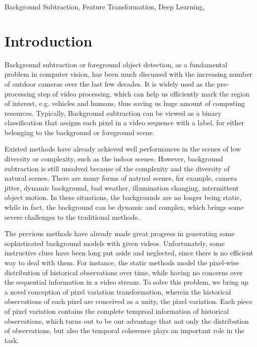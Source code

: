 \documentclass[journal]{IEEEtran}
\begin{document}
\begin{IEEEkeywords} 
    Background Subtraction, Feature Transformation, Deep Learning,
\end{IEEEkeywords}

\IEEEpeerreviewmaketitle

\section{Introduction}
Background subtraction or foreground object detection, as a fundamental problem in computer vision, has been much discussed with the increasing number of outdoor cameras over the last few decades.
It is widely used as the pre-processing step of video processing, which can help us efficiently mark the region of interest, e.g. vehicles and humans, thus saving us huge amount of computing resources.
Typically, Background subtraction can be viewed as a binary classification that assigns each pixel in a video sequence with a label, for either belonging to the background or foreground scene. 

Existed methods have already achieved well performances in the scenes of low diversity or complexity, such as the indoor scenes. However, background subtraction is still unsolved because of the complexity and the diversity of natural scenes.
There are many forms of natrual scenes, for example, camera jitter, dynamic background, bad weather, illumination changing, intermittent object motion. In these situations, the backgrounds are no longer being static, while in fact, the background can be dynamic and complex, which brings some severe challenges to the traditional methods.

The previous methods have already made great progress in generating some sophisticated background models with given videos. Unfortunately, some instructive clues have been long put aside and neglected, since there is no efficient way to deal with them. For instance, the static methods model the pixel-wise distribution of historical observations over time, while having no concerns over the sequential information in a video stream. To solve this problem, we bring up a novel conception of pixel variation transformation, wherein the historical observations of each pixel are conceived as a unity, the pixel variation. Each piece of pixel variation contains the complete temproal information of historical observations, which turns out to be our advantage that not only the distribution of observations, but also the temporal coherence plays an important role in the task.
\end{document}
